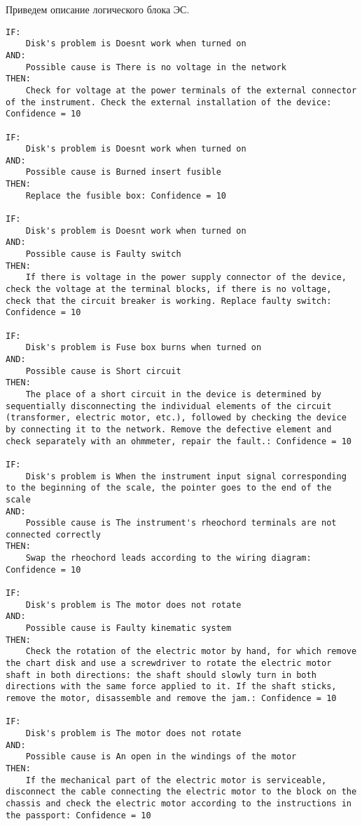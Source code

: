 Приведем описание логического блока ЭС.

\begin{lstlisting}[caption={Алгоритм работы ЭС}]
IF:
	Disk's problem is Doesnt work when turned on
AND:
	Possible cause is There is no voltage in the network
THEN:
	Check for voltage at the power terminals of the external connector of the instrument. Check the external installation of the device: Confidence = 10

IF:
	Disk's problem is Doesnt work when turned on
AND:
	Possible cause is Burned insert fusible
THEN:
	Replace the fusible box: Confidence = 10

IF:
	Disk's problem is Doesnt work when turned on
AND:
	Possible cause is Faulty switch
THEN:
	If there is voltage in the power supply connector of the device, check the voltage at the terminal blocks, if there is no voltage, check that the circuit breaker is working. Replace faulty switch: Confidence = 10

IF:
	Disk's problem is Fuse box burns when turned on
AND:
	Possible cause is Short circuit
THEN:
	The place of a short circuit in the device is determined by sequentially disconnecting the individual elements of the circuit (transformer, electric motor, etc.), followed by checking the device by connecting it to the network. Remove the defective element and check separately with an ohmmeter, repair the fault.: Confidence = 10

IF:
	Disk's problem is When the instrument input signal corresponding to the beginning of the scale, the pointer goes to the end of the scale
AND:
	Possible cause is The instrument's rheochord terminals are not connected correctly
THEN:
	Swap the rheochord leads according to the wiring diagram: Confidence = 10

IF:
	Disk's problem is The motor does not rotate
AND:
	Possible cause is Faulty kinematic system
THEN:
	Check the rotation of the electric motor by hand, for which remove the chart disk and use a screwdriver to rotate the electric motor shaft in both directions: the shaft should slowly turn in both directions with the same force applied to it. If the shaft sticks, remove the motor, disassemble and remove the jam.: Confidence = 10

IF:
	Disk's problem is The motor does not rotate
AND:
	Possible cause is An open in the windings of the motor
THEN:
	If the mechanical part of the electric motor is serviceable, disconnect the cable connecting the electric motor to the block on the chassis and check the electric motor according to the instructions in the passport: Confidence = 10


\end{lstlisting}
